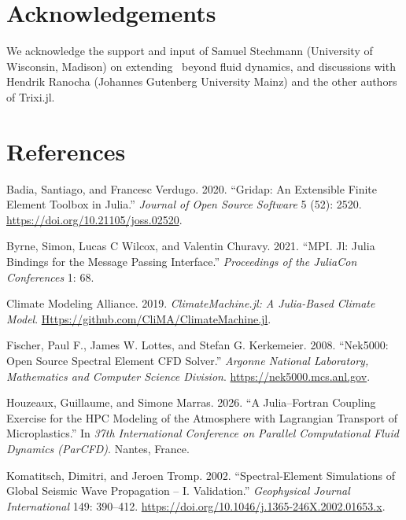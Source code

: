 \documentclass[10pt,onecolumn]{article}
\begin{document}
\section{Acknowledgements}\label{acknowledgements}

We acknowledge the support and input of Samuel Stechmann (University of
Wisconsin, Madison) on extending \je~beyond fluid dynamics, and discussions with
Hendrik Ranocha (Johannes Gutenberg University Mainz) and the other authors of
Trixi.jl.

\section*{References}\label{references}

\protect{}\label{refs}
\begin{CSLReferences}{1}{1}

Badia, Santiago, and Francesc Verdugo. 2020. {``Gridap: An Extensible
Finite Element Toolbox in {J}ulia.''} \emph{Journal of Open Source
Software} 5 (52): 2520. \url{https://doi.org/10.21105/joss.02520}.

Byrne, Simon, Lucas C Wilcox, and Valentin Churavy. 2021. {``MPI. Jl:
Julia Bindings for the Message Passing Interface.''} \emph{Proceedings
of the JuliaCon Conferences} 1: 68.

Climate Modeling Alliance. 2019. \emph{{ClimateMachine.jl}: A
Julia-Based Climate Model}.
\href{https://github.com/CliMA/ClimateMachine.jl}{Https://github.com/CliMA/ClimateMachine.jl}.

Fischer, Paul F., James W. Lottes, and Stefan G. Kerkemeier. 2008.
{``Nek5000: Open Source Spectral Element {CFD} Solver.''} \emph{Argonne
National Laboratory, Mathematics and Computer Science Division}.
\url{https://nek5000.mcs.anl.gov}.

Houzeaux, Guillaume, and Simone Marras. 2026. {``A {J}ulia--{F}ortran Coupling
Exercise for the {HPC} Modeling of the Atmosphere with {L}agrangian Transport of
Microplastics.''} In \emph{37th International Conference on Parallel
Computational Fluid Dynamics (ParCFD)}. Nantes, France.

Komatitsch, Dimitri, and Jeroen Tromp. 2002. {``Spectral-Element
Simulations of Global Seismic Wave Propagation -- {I}. {V}alidation.''}
\emph{Geophysical Journal International} 149: 390--412.
\url{https://doi.org/10.1046/j.1365-246X.2002.01653.x}.


\end{CSLReferences}
\end{document}
